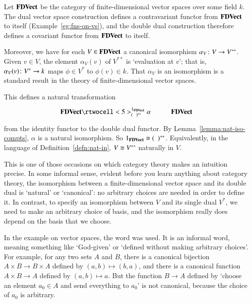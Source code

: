 \begin{example}
Let $\mathbf{FDVect}$%
%
%
be the category of finite-dimensional vector spaces over some field $k$.
The dual%
%
%
%
vector space construction defines a contravariant functor from $\mathbf{FDVect}$ to
itself (Example~\ref{eg:fns-on-vs}), and the double dual construction
therefore defines a covariant functor from $\mathbf{FDVect}$ to itself.

Moreover, we have for each $V \in \mathbf{FDVect}$ a canonical isomorphism
$\alpha_V\from V \to V^{**}$.  Given $v \in V$, the element $\alpha_V(v)$
of $V^{**}$ is `evaluation%
%
%
at $v$'; that is, $\alpha_V(v)\from V^* \to k$ maps $\phi \in V^*$ to
$\phi(v) \in k$.  That $\alpha_V$ is an isomorphism is a standard result in
the theory of finite-dimensional vector spaces.

This defines a natural transformation
\[
\xymatrix{
\FDVect
\rtwocell<5>^{1_\FDVect}_{\blank^{**}}{\alpha} &
\FDVect
}
\]
from the identity functor to the double dual functor.  By
Lemma~\ref{lemma:nat-iso-compts}, $\alpha$ is a natural isomorphism.  So
$1_{\mathbf{FDVect}} \cong (\hspace*{.5em})^{**}$.  Equivalently, in the language of
Definition~\ref{defn:nat-in}, $V \cong V^{**}$ naturally in $V$.

This is one of those occasions on which category theory makes an intuition
precise.  In some informal sense, evident before you learn anything about
category theory, the isomorphism between a finite-dimensional vector space
and its double dual is `natural' or `canonical': no arbitrary choices are
needed in order to define it.  In contrast, to specify an isomorphism
between $V$ and its single dual $V^*$, we need to make an arbitrary choice
of basis, and the isomorphism really does depend on the basis that we
choose.
\end{example}

In the example on vector spaces, the word %
%
%
was used.  It is an informal word, meaning something like `God-given' or
`defined without making arbitrary choices'.  For example, for any two sets
$A$ and $B$, there is a canonical bijection $A \times B \to B \times A$
defined by $(a, b) \mapsto (b, a)$, and there is a canonical function $A
\times B \to A$ defined by $(a, b) \mapsto a$.  But the function $B \to A$
defined by `choose an element $a_0 \in A$ and send everything to $a_0$' is
not canonical, because the choice of $a_0$ is arbitrary.

\subjectchange

